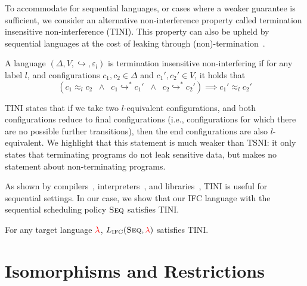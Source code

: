\documentclass{llncs}
\newcommand{\Red}[1]{{\color{red} #1}}
\begin{document}
To accommodate for sequential languages, or cases where a weaker guarantee
is sufficient, we consider an alternative non-interference property called termination insensitive
non-interference (TINI).  This property can also be upheld by sequential languages at the cost
of leaking through (non)-termination~\cite{Askarov:2008}.
\begin{definition}
  A language \ensuremath{(\Delta,V,\hookrightarrow,\varepsilon_{l})} is termination
  insensitive non-interfering if for any label \ensuremath{l}, and configurations
  $\ensuremath{c_{1},c_{2}}\in\ensuremath{\Delta}$ and $\ensuremath{c_{1}',c_{2}'}\in\ensuremath{V}$, it holds that
  \[
    (\ensuremath{c_{1}} \approx_{\ensuremath{l}} \ensuremath{c_{2}}
    \;\;\land\;\;
    \ensuremath{c_{1}} \ensuremath{\hookrightarrow}^* \ensuremath{c_{1}'}
    \;\;\land\;\;
    \ensuremath{c_{2}} \ensuremath{\hookrightarrow}^* \ensuremath{c_{2}'})
    \implies
    \ensuremath{c_{1}'} \approx_{\ensuremath{l}} \ensuremath{c_{2}'}
  \]
\end{definition}

TINI states that if we take two \ensuremath{l}-equivalent configurations, and both
configurations reduce to final configurations (i.e.,
configurations for which there are no
possible further transitions), then the end configurations are also
\ensuremath{l}-equivalent.
We highlight that this statement is much weaker than TSNI: it only states that
terminating programs do not leak sensitive data, but makes no statement
about non-terminating programs.

As shown by compilers~\cite{jif,FlowCaml}, interpreters~\cite{JSFlow}, and
libraries~\cite{Russo+:Haskell08,lio}, TINI is useful for sequential
settings. In our case, we show that our IFC language with the sequential scheduling policy
\ensuremath{\textsc{Seq}} satisfies TINI.
\begin{theorem}
  \label{thm:seq-tini}
For any target language \ensuremath{\Red{\lambda}}, \ensuremath{L_\text{IFC}(\textsc{Seq},\Red{\lambda})} satisfies TINI.
\end{theorem}



\section{Isomorphisms and Restrictions}
\label{sec:concrete}

\newcommand{\con}[1]{\ensuremath{{\color{red} #1}}}
\newcommand{\abs}[1]{\ensuremath{{\color{blue} #1}}}
\end{document}
